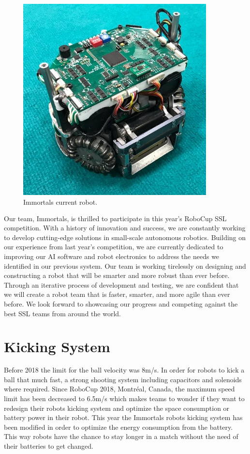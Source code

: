 \documentclass[runningheads]{llncs}
\begin{document}
\begin{figure}
\centering
\includegraphics[width=10cm]{images/std_robot.jpeg}
\caption{Immortals current robot.} \label{fig_std_robot}
\end{figure}

Our team, Immortals, is thrilled to participate in this year's RoboCup SSL competition. With a history of innovation and success, we are constantly working to develop cutting-edge solutions in small-scale autonomous robotics. Building on our experience from last year's competition, we are currently dedicated to improving our AI software and robot electronics to address the needs we identified in our previous system. Our team is working tirelessly on designing and constructing a robot that will be smarter and more robust than ever before. Through an iterative process of development and testing, we are confident that we will create a robot team that is faster, smarter, and more agile than ever before. We look forward to showcasing our progress and competing against the best SSL teams from around the world.


\section{Kicking System}
Before 2018 the limit for the ball velocity was 8m/s. In order for robots to kick a ball that much fast, a strong shooting system including capacitors and solenoids where required. Since RoboCup 2018, Montréal, Canada, the maximum speed limit has been decreased to 6.5m/s which makes teams to wonder if they want to redesign their robots kicking system and optimize the space consumption or battery power in their robot. This year the Immortals robots kicking system has been modified in order to optimize the energy consumption from the battery. This way robots have the chance to stay longer in a match without the need of their batteries to get changed.
\end{document}
